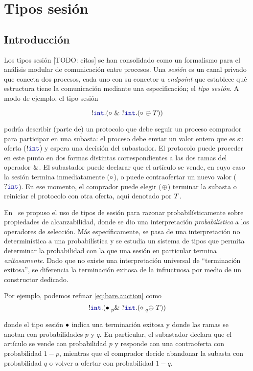 \chapter{Tipos sesión}
\section{Introducción}

Los tipos sesión [TODO: citas] se han consolidado como un formalismo para el
análisis modular de comunicación entre procesos. Una \emph{sesión} es un canal
privado que conecta dos procesos, cada uno con su conector u \emph{endpoint} que
establece qué estructura tiene la comunicación mediante una especificación; el
\emph{tipo sesión}. A modo de ejemplo, el tipo sesión

\begin{equation}
    \label{eq:bare.auction}
    \cout \tint \parens {
        \tbranch [] \tend {
            \cin \tint \parens {
                \tchoice [] \tend \T
            }
        }
    }
\end{equation}

podría describir (parte de) un protocolo que debe seguir un proceso comprador
para participar en una subasta: el proceso debe enviar un valor entero que es su
oferta ($ \cout [] \tint $) y espera una decisión del subastador. El protocolo
puede proceder en este punto en dos formas distintas correspondientes a las dos
ramas del operador $ \tbranch [] {} {}$. El subastador puede declarar que el
artículo se vende, en cuyo caso la sesión termina inmediatamente ($ \tend $), o
puede contraofertar un nuevo valor ($ \cin [] \tint $). En ese momento, el
comprador puede elegir ($ \tchoice [] {} {} $) terminar la subasta o reiniciar
el protocolo con otra oferta, aquí denotado por $\T$.

En~\cite{DBLP:conf/concur/InversoMPTT20} se propuso el uso de tipos de sesión
para razonar probabilísticamente sobre propiedades de alcanzabilidad, donde se
dio una interpretación \emph{probabilística} a los operadores de selección. Más
específicamente, se pasa de una interpretación no determinística a una
probabilística y se estudia un sistema de tipos que permita determinar la
probabilidad con la que una sesión en particular termina \emph{exitosamente}.
Dado que no existe una interpretación universal de ``terminación exitosa'', se
diferencia la terminación exitosa de la infructuosa por medio de un constructor
dedicado.

Por ejemplo, podemos refinar \eqref{eq:bare.auction} como
\begin{equation}
    \label{eq:refined.auction}
    \cout\tint\parens{
        \tbranch[p]\tdone{
            \cin\tint\parens{
                \tchoice[q]\tend\T
            }
        }
    }
\end{equation}

donde el tipo sesión $\tdone$ indica una terminación exitosa y donde las
ramas  se anotan con probabilidades $p$ y $q$. En particular, el subastador
declara que el artículo se vende con probabilidad $p$ y  responde con una
contraoferta con probabilidad $1-p$, mientras que el comprador decide abandonar
la subasta con probabilidad $q$ o volver a ofertar  con probabilidad $1-q$.